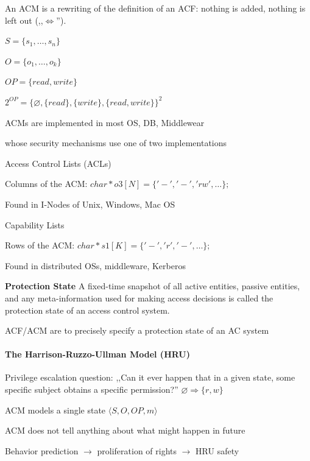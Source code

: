 \documentclass[a4paper]{article}
\renewcommand{\note}[2]{\begin{noteBox} \textbf{#1} #2 \end{noteBox}}
\begin{document}
\begin{multicols}{3}
    An ACM is a rewriting of the definition of an ACF: nothing is added, nothing is left out (,,$\Leftrightarrow$'').
    \begin{itemize*}
        \item $S=\{s_1 ,\dots ,s_n\}$
        \item $O=\{o_1 ,\dots ,o_k\}$
        \item $OP=\{read,write\}$
        \item $2^{OP}=\{\varnothing,\{read\},\{write\},\{read,write\}\}^2$
    \end{itemize*}
    \begin{itemize*}
        \item ACMs are implemented in most OS, DB, Middlewear
        \item whose security mechanisms use one of two implementations
    \end{itemize*}

    Access Control Lists (ACLs)
    \begin{itemize*}
        \item Columns of the ACM: $char*o3[N]=\{ '-', '-', 'rw', \dots \};$
        \item Found in I-Nodes of Unix, Windows, Mac OS
    \end{itemize*}

    Capability Lists
    \begin{itemize*}
        \item Rows of the ACM: $char* s1[K]=\{'-', 'r', '-', \dots \};$
        \item Found in distributed OSs, middleware, Kerberos
    \end{itemize*}

    \note{Protection State}{A fixed-time snapshot of all active entities, passive entities, and any meta-information used for making access decisions is called the protection state of an access control system.}

    ACF/ACM are to precisely specify a protection state of an AC system

    \paragraph{The Harrison-Ruzzo-Ullman Model (HRU)}

    Privilege escalation question: ,,Can it ever happen that in a given state, some specific subject obtains a specific permission?'' $\varnothing \Rightarrow \{r,w\}$
    \begin{itemize*}
        \item ACM models a single state $\langle S,O,OP,m\rangle$
        \item ACM does not tell anything about what might happen in future
        \item Behavior prediction $\rightarrow$ proliferation of rights $\rightarrow$ HRU safety
    \end{itemize*}


\end{multicols}
\end{document}
